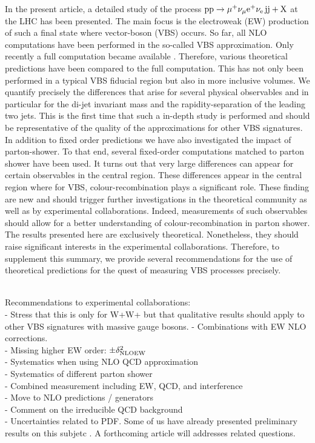 In the present article, a detailed study of the process $\text{p}\text{p}\to\mu^+\nu_\mu{\rm e}^+\nu_{\rm e}\,\text{j}\text{j}+\mathrm{X}$ at the LHC has been presented.
The main focus is the electroweak (EW) production of such a final state where vector-boson (VBS) occurs.
So far, all NLO computations have been performed in the so-called VBS approximation.
Only recently a full computation became available \cite{Biedermann:2017bss}.
Therefore, various theoretical predictions have been compared to the full computation.
This has not only been performed in a typical VBS fiducial region but also in more inclusive volumes.
We quantify precisely the differences that arise for several physical observables and in particular for the di-jet invariant mass and the rapidity-separation of the leading two jets.
This is the first time that such a in-depth study is performed and should be representative of the quality of the approximations for other VBS signatures.
In addition to fixed order predictions we have also investigated the impact of parton-shower.
To that end, several fixed-order computations matched to parton shower have been used.
It turns out that very large differences can appear for certain observables in the central region.
These differences appear in the central region where for VBS, colour-recombination plays a significant role.
These finding are new and should trigger further investigations in the theoretical community as well as by experimental collaborations.
Indeed, measurements of such observables should allow for a better understanding of colour-recombination in parton shower.
The results presented here are exclusively theoretical.
Nonetheless, they should raise significant interests in the experimental collaborations.
Therefore, to supplement this summary, we provide several recommendations for the use of theoretical predictions for the quest of measuring VBS processes precisely.


 \\
Recommendations to experimental collaborations: \\
- Stress that this is only for W+W+ but that qualitative results should apply to other VBS signatures with massive gauge bosons.
- Combinations with EW NLO corrections. \\
- Missing higher EW order: $\pm \delta^2_{\rm NLO EW}$ \\
- Systematics when using NLO QCD approximation \\
- Systematics of different parton shower \\
- Combined measurement including  EW, QCD, and interference \\
- Move to NLO predictions / generators \\
- Comment on the irreducible QCD background \\
- Uncertainties related to PDF.
Some of us have already presented preliminary results on this subjetc \cite{}. %
A forthcoming article will addresses related questions.
